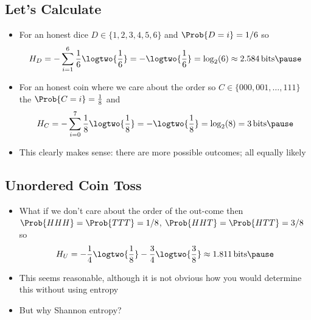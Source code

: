 
\begin{slide}
\section{Let's Calculate}

\begin{PauseHighLight}
  \begin{itemize}
  \item For an honest dice $D \in\{1,2,3,4,5,6\}$ and $\Prob{D=i} = 1/6$
    so
    \begin{align*}
      H_D = - \sum_{i=1}^6 \frac{1}{6} \logtwo{ \frac{1}{6}} = - \logtwo{
      \frac{1}{6}} = \log_2(6) \approx 2.584 \bits\pause
    \end{align*}
  \item For an honest coin where we care about the order so $C \in
    \{000,001,\ldots, 111\}$ the $\Prob{C=i} = \frac{1}{8}$ and
    \begin{align*}
      H_C = - \sum_{i=0}^7 \frac{1}{8} \logtwo{ \frac{1}{8}} = - \logtwo{
      \frac{1}{8}} = \log_2(8) = 3 \bits\pause
    \end{align*}
  \item This clearly makes sense: there are more possible outcomes; all
    equally likely\pause
  \end{itemize}
\end{PauseHighLight}


\end{slide}


\begin{slide}
\section{Unordered Coin Toss}

\begin{PauseHighLight}
  \begin{itemize}
  \item What if we don't care about the order of the out-come then
    $\Prob{HHH}=\Prob{TTT}=1/8$, $\Prob{HHT}=\Prob{HTT}=3/8$ so
    \begin{align*}
      H_U = -\frac{1}{4} \logtwo{\frac{1}{8}} - \frac{3}{4}
      \logtwo{\frac{3}{8}}\approx 1.811 \bits\pause
    \end{align*}
  \item This seems reasonable, although it is not obvious how you
    would determine this without using entropy\pause
  \item But why Shannon entropy?\pauseb
  \end{itemize}
\end{PauseHighLight}

\end{slide}

